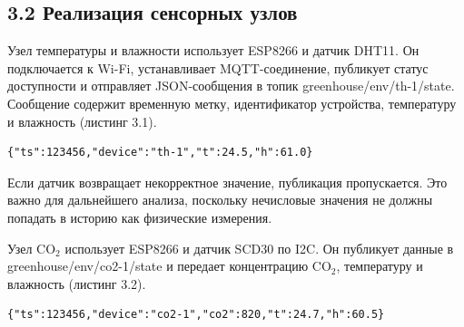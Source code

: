 \documentclass[a4paper,14pt]{extarticle}
\renewcommand{\texttt}[1]{\textnormal{#1}}
\begin{document}
\hypertarget{ux440ux435ux430ux43bux438ux437ux430ux446ux438ux44f-ux441ux435ux43dux441ux43eux440ux43dux44bux445-ux443ux437ux43bux43eux432}{%
\subsection{3.2 Реализация сенсорных
узлов}\label{ux440ux435ux430ux43bux438ux437ux430ux446ux438ux44f-ux441ux435ux43dux441ux43eux440ux43dux44bux445-ux443ux437ux43bux43eux432}}

Узел температуры и влажности использует ESP8266 и датчик DHT11. Он
подключается к Wi-Fi, устанавливает MQTT-соединение, публикует статус
доступности и отправляет JSON-сообщения в топик
\texttt{greenhouse/env/th-1/state}. Сообщение содержит временную метку,
идентификатор устройства, температуру и влажность (листинг 3.1).

\par\vspace{10pt}\noindent\begin{minipage}{\linewidth}
\nopagebreak
\setlength{\topsep}{3pt}\setlength{\partopsep}{0pt}
\begin{verbatim}
{"ts":123456,"device":"th-1","t":24.5,"h":61.0}
\end{verbatim}
\end{minipage}\par\vspace{8pt}

Если датчик возвращает некорректное значение, публикация пропускается.
Это важно для дальнейшего анализа, поскольку нечисловые значения не
должны попадать в историю как физические измерения.

Узел CO\(_2\) использует ESP8266 и датчик SCD30 по I2C. Он публикует
данные в \texttt{greenhouse/env/co2-1/state} и передает концентрацию
CO\(_2\), температуру и влажность (листинг 3.2).

\par\vspace{10pt}\noindent\begin{minipage}{\linewidth}
\nopagebreak
\setlength{\topsep}{3pt}\setlength{\partopsep}{0pt}
\begin{verbatim}
{"ts":123456,"device":"co2-1","co2":820,"t":24.7,"h":60.5}
\end{verbatim}
\end{minipage}\par\vspace{8pt}
\end{document}
